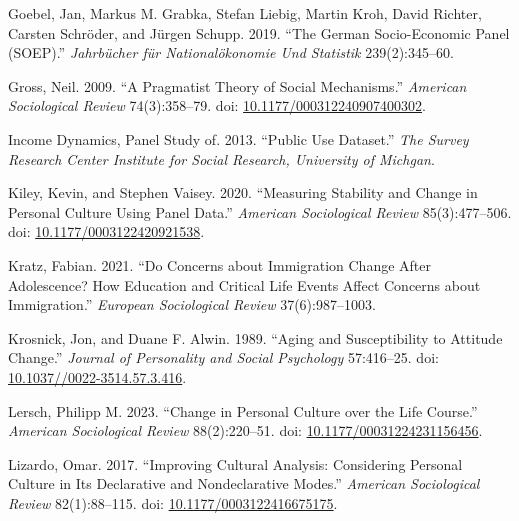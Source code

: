 \documentclass[
  11pt,
]{article}
\newlength{\cslhangindent}
\newlength{\cslentryspacingunit} %
\newenvironment{CSLReferences}[2] %
 {%
  \setlength{\parindent}{0pt}
  \ifodd #1
  \let\oldpar\par
  \def\par{\hangindent=\cslhangindent\oldpar}
  \fi
  \setlength{\parskip}{#2\cslentryspacingunit}
 }%
 {}
\begin{document}
\begin{CSLReferences}{1}{0}
\leavevmode{}%
Goebel, Jan, Markus M. Grabka, Stefan Liebig, Martin Kroh, David
Richter, Carsten Schröder, and Jürgen Schupp. 2019. {``The German
Socio-Economic Panel (SOEP).''} \emph{Jahrb{ü}cher f{ü}r
National{ö}konomie Und Statistik} 239(2):345--60.

\leavevmode{}%
Gross, Neil. 2009. {``A {Pragmatist} {Theory} of {Social}
{Mechanisms}.''} \emph{American Sociological Review} 74(3):358--79. doi:
\href{https://doi.org/10.1177/000312240907400302}{10.1177/000312240907400302}.

\leavevmode{}%
Income Dynamics, Panel Study of. 2013. {``Public Use Dataset.''}
\emph{The Survey Research Center Institute for Social Research,
University of Michgan}.

\leavevmode{}%
Kiley, Kevin, and Stephen Vaisey. 2020. {``Measuring {Stability} and
{Change} in {Personal} {Culture} {Using} {Panel} {Data}.''}
\emph{American Sociological Review} 85(3):477--506. doi:
\href{https://doi.org/10.1177/0003122420921538}{10.1177/0003122420921538}.

\leavevmode{}%
Kratz, Fabian. 2021. {``Do Concerns about Immigration Change After
Adolescence? How Education and Critical Life Events Affect Concerns
about Immigration.''} \emph{European Sociological Review}
37(6):987--1003.

\leavevmode{}%
Krosnick, Jon, and Duane F. Alwin. 1989. {``Aging and {Susceptibility}
to {Attitude} {Change}.''} \emph{Journal of Personality and Social
Psychology} 57:416--25. doi:
\href{https://doi.org/10.1037//0022-3514.57.3.416}{10.1037//0022-3514.57.3.416}.

\leavevmode{}%
Lersch, Philipp M. 2023. {``Change in {Personal} {Culture} over the
{Life} {Course}.''} \emph{American Sociological Review} 88(2):220--51.
doi:
\href{https://doi.org/10.1177/00031224231156456}{10.1177/00031224231156456}.

\leavevmode{}%
Lizardo, Omar. 2017. {``Improving {Cultural} {Analysis}: {Considering}
{Personal} {Culture} in Its {Declarative} and {Nondeclarative}
{Modes}.''} \emph{American Sociological Review} 82(1):88--115. doi:
\href{https://doi.org/10.1177/0003122416675175}{10.1177/0003122416675175}.


\end{CSLReferences}
\end{document}
